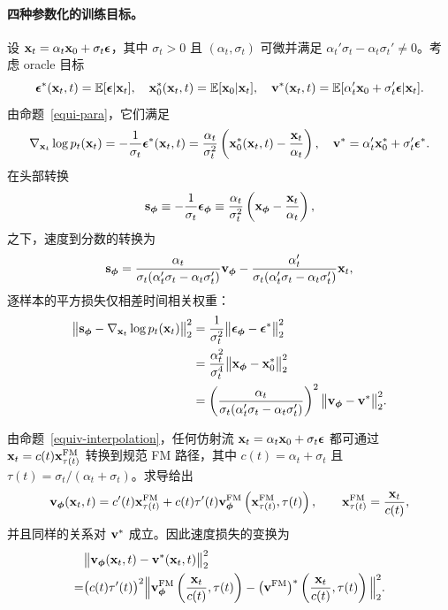 \paragraph{四种参数化的训练目标。}
设 ${\mathbf{x}}_t=\alpha_t {\mathbf{x}}_0+\sigma_t {\bm{\epsilon}}$，其中 $\sigma_t>0$ 且 $(\alpha_t,\sigma_t)$ 可微并满足 $\alpha_t'\sigma_t-\alpha_t\sigma_t'\neq 0$。考虑 oracle 目标
\[
{\bm{\epsilon}}^*({\mathbf{x}}_t,t)=\mathbb{E}[{\bm{\epsilon}}|{\mathbf{x}}_t],\quad 
{\mathbf{x}}_0^*({\mathbf{x}}_t,t)=\mathbb{E}[{\mathbf{x}}_0|{\mathbf{x}}_t],\quad
{\mathbf{v}}^*({\mathbf{x}}_t,t)=\mathbb{E}[\alpha_t'{\mathbf{x}}_0+\sigma_t'{\bm{\epsilon}}|{\mathbf{x}}_t].
\]
由命题~\ref{equi-para}，它们满足
\[
\nabla_{{\mathbf{x}}_t}\log p_t({\mathbf{x}}_t)
= -\frac{1}{\sigma_t} {\bm{\epsilon}}^*({\mathbf{x}}_t,t)
= \frac{\alpha_t}{\sigma_t^2} \left({\mathbf{x}}_0^*({\mathbf{x}}_t,t)-\frac{{\mathbf{x}}_t}{\alpha_t}\right),
\quad
{\mathbf{v}}^*=\alpha_t' {\mathbf{x}}_0^*+\sigma_t' {\bm{\epsilon}}^*.
\]
在头部转换
\[
{\mathbf{s}}_{{\bm{\phi}}} \equiv -\frac{1}{\sigma_t} {\bm{\epsilon}}_{{\bm{\phi}}}
\equiv \frac{\alpha_t}{\sigma_t^2} \left({\mathbf{x}}_{{\bm{\phi}}}-\frac{{\mathbf{x}}_t}{\alpha_t}\right),
\]
之下，速度到分数的转换为
\[
{\mathbf{s}}_{{\bm{\phi}}}
= \frac{\alpha_t}{\sigma_t(\alpha_t'\sigma_t-\alpha_t\sigma_t')} {\mathbf{v}}_{{\bm{\phi}}}
- \frac{\alpha_t'}{\sigma_t(\alpha_t'\sigma_t-\alpha_t\sigma_t')} {\mathbf{x}}_t,
\]
逐样本的平方损失仅相差时间相关权重：
\begin{align}\label{eq:s-e-x-v-equi}
\begin{aligned}
\big\|{\mathbf{s}}_{{\bm{\phi}}}-\nabla_{{\mathbf{x}}_t}\log p_t({\mathbf{x}}_t)\big\|_2^2
&=\frac{1}{\sigma_t^2} \big\|{\bm{\epsilon}}_{{\bm{\phi}}}-{\bm{\epsilon}}^*\big\|_2^2 \\
&=\frac{\alpha_t^2}{\sigma_t^4} \big\|{\mathbf{x}}_{{\bm{\phi}}}-{\mathbf{x}}_0^*\big\|_2^2 \\
&=\left(\frac{\alpha_t}{\sigma_t(\alpha_t'\sigma_t-\alpha_t\sigma_t')}\right)^{ 2}
\big\|{\mathbf{v}}_{{\bm{\phi}}}-{\mathbf{v}}^*\big\|_2^2 .
\end{aligned}
\end{align}

由命题~\ref{equiv-interpolation}，任何仿射流 ${\mathbf{x}}_t=\alpha_t{\mathbf{x}}_0+\sigma_t{\bm{\epsilon}}$
都可通过 ${\mathbf{x}}_t=c(t){\mathbf{x}}^{\mathrm{FM}}_{\tau(t)}$ 转换到规范 FM 路径，其中
$c(t)=\alpha_t+\sigma_t$ 且 $\tau(t)=\sigma_t/(\alpha_t+\sigma_t)$。求导给出
\[
{\mathbf{v}}_{{\bm{\phi}}}({\mathbf{x}}_t,t)=c'(t){\mathbf{x}}^{\mathrm{FM}}_{\tau(t)}
+c(t)\tau'(t){\mathbf{v}}^{\mathrm{FM}}_{{\bm{\phi}}} \left({\mathbf{x}}_{\tau(t)}^{\mathrm{FM}},\tau(t)\right),
\qquad
{\mathbf{x}}_{\tau(t)}^{\mathrm{FM}}=\frac{{\mathbf{x}}_t}{c(t)},
\]
并且同样的关系对 ${\mathbf{v}}^*$ 成立。因此速度损失的变换为
\begin{align*}
    &\big\|{\mathbf{v}}_{{\bm{\phi}}}({\mathbf{x}}_t,t)-{\mathbf{v}}^*({\mathbf{x}}_t,t)\big\|_2^2
\\= &\big(c(t) \tau'(t)\big)^2
\Big\|{\mathbf{v}}^{\mathrm{FM}}_{{\bm{\phi}}} \left(\frac{{\mathbf{x}}_t}{c(t)},\tau(t)\right)
-\big({\mathbf{v}}^{\mathrm{FM}}\big)^* \left(\frac{{\mathbf{x}}_t}{c(t)},\tau(t)\right)\Big\|_2^2.
\end{align*}


